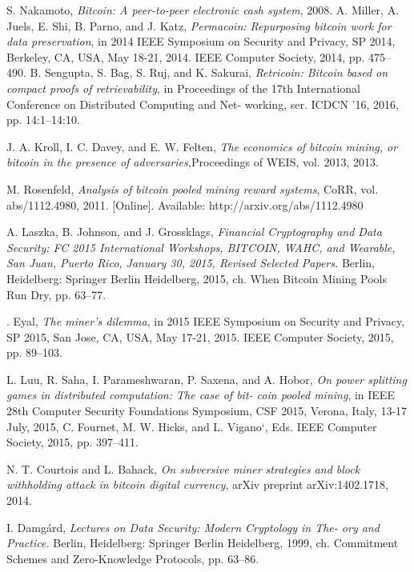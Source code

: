 \documentclass[12pt]{article}
\begin{document}
 \begin{thebibliography}{8}
 
 S. Nakamoto, 
 \textit{Bitcoin: A peer-to-peer electronic cash system}, 2008.
 A. Miller, A. Juels, E. Shi, B. Parno, and J. Katz, 
 \textit{Permacoin: Repurposing bitcoin work for data preservation}, in 2014 IEEE Symposium on Security and Privacy, SP 2014, Berkeley, CA, USA, May 18-21, 2014. IEEE Computer Society, 2014, pp. 475–490.
 B. Sengupta, S. Bag, S. Ruj, and K. Sakurai, 
 \textit{Retricoin: Bitcoin based on compact proofs of retrievability}, in Proceedings of the 17th International Conference on Distributed Computing and Net- working, ser. ICDCN ’16, 2016, pp. 14:1–14:10.

 J. A. Kroll, I. C. Davey, and E. W. Felten, 
 \textit{The economics of bitcoin mining, or bitcoin in the presence of adversaries,}Proceedings of WEIS, vol. 2013, 2013.

 M. Rosenfeld,
 \textit{Analysis of bitcoin pooled mining reward systems}, CoRR, vol. abs/1112.4980, 2011. [Online]. Available: http://arxiv.org/abs/1112.4980

 A. Laszka, B. Johnson, and J. Grossklags, 
 \textit{Financial Cryptography and Data Security: FC 2015 International Workshops, BITCOIN, WAHC, and Wearable, San Juan, Puerto Rico, January 30, 2015, Revised Selected Papers.} Berlin, Heidelberg: Springer Berlin Heidelberg, 2015, ch. When Bitcoin Mining Pools Run Dry, pp. 63–77.

 . Eyal, 
 \textit{The miner’s dilemma}, in 2015 IEEE Symposium on Security and Privacy, SP 2015, San Jose, CA, USA, May 17-21, 2015. IEEE Computer Society, 2015, pp. 89–103.

 L. Luu, R. Saha, I. Parameshwaran, P. Saxena, and A. Hobor, 
 \textit{On power splitting games in distributed computation: The case of bit- coin pooled mining}, in IEEE 28th Computer Security Foundations Symposium, CSF 2015, Verona, Italy, 13-17 July, 2015, C. Fournet, M. W. Hicks, and L. Vigano`, Eds. IEEE Computer Society, 2015, pp. 397–411.

 N. T. Courtois and L. Bahack, 
 \textit{On subversive miner strategies and block withholding attack in bitcoin digital currency}, arXiv preprint arXiv:1402.1718, 2014.
 
 I. Damg{\'a}rd, 
 \textit{Lectures on Data Security: Modern Cryptology in The- ory and Practice.} Berlin, Heidelberg: Springer Berlin Heidelberg, 1999, ch. Commitment Schemes and Zero-Knowledge Protocols, pp. 63–86.
 

\end{thebibliography}
\end{document}
